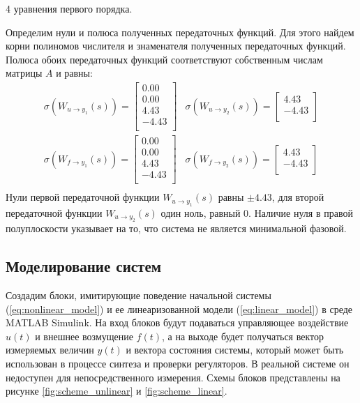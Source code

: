 4 уравнения первого порядка. 

Определим нули и полюса полученных передаточных функций. Для этого найдем корни полиномов числителя и знаменателя 
полученных передаточных функций. 
Полюса обоих передаточных функций соответствуют собственным числам матрицы $A$ и равны:
\begin{equation}
    \begin{array}{cccc}
        \sigma(W_{u \rightarrow y_1}(s)) = \begin{bmatrix}
        0.00 \\ 
        0.00 \\ 
        4.43 \\ 
        -4.43 \\ 
        \end{bmatrix}  & 
        \sigma(W_{u \rightarrow y_2}(s)) = \begin{bmatrix}
        4.43 \\ 
        -4.43 \\ 
        \end{bmatrix} \\[4em]
        \sigma(W_{f \rightarrow y_1}(s)) = \begin{bmatrix}
        0.00 \\ 
        0.00 \\ 
        4.43 \\ 
        -4.43 \\ 
        \end{bmatrix}  & 
        \sigma(W_{f \rightarrow y_2}(s)) = \begin{bmatrix}
        4.43 \\ 
        -4.43 \\ 
        \end{bmatrix} \\ 
    \end{array}
\end{equation}
Нули первой передаточной функции $W_{u \rightarrow y_1}(s)$ равны $\pm 4.43$, 
для второй передаточной функции $W_{u \rightarrow y_2}(s)$ один ноль, равный $0$. Наличие 
нуля в правой полуплоскости указывает на то, что система не является минимальной фазовой. 


\subsection{Моделирование систем}
Создадим блоки, имитирующие поведение начальной системы (\ref{eq:nonlinear_model}) и ее линеаризованной модели (\ref{eq:linear_model})
в среде MATLAB Simulink. На вход блоков будут подаваться управляющее воздействие $u(t)$ и внешнее возмущение $f(t)$, 
а на выходе будет получаться вектор измеряемых величин $y(t)$ и вектора состояния системы, который может быть 
использован в процессе синтеза и проверки регуляторов. В реальной системе он недоступен для непосредственного измерения.
Схемы блоков представлены на рисунке \ref{fig:scheme_unlinear} и \ref{fig:scheme_linear}. 

